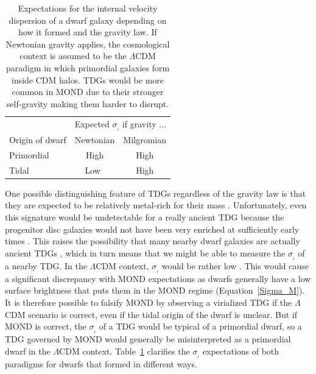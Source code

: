 \documentclass[fleqn,usenatbib,useAMS,onecolumn]{mnras} %
\begin{document}
\begin{table}
	\centering
	\begin{tabular}{lcc}
		\hline
		& \multicolumn{2}{c}{Expected $\sigma_{_i}$ if gravity $\ldots$} \\
		Origin of dwarf & Newtonian & Milgromian \\ \hline
		Primordial & High & High \\
		Tidal & Low~ & High \\ \hline
	\end{tabular}
	\caption{Expectations for the internal velocity dispersion of a dwarf galaxy depending on how it formed and the gravity law. If Newtonian gravity applies, the cosmological context is assumed to be the $\Lambda$CDM paradigm in which primordial galaxies form inside CDM halos. TDGs would be more common in MOND due to their stronger self-gravity making them harder to disrupt.}
	\label{Dwarf_type_gravity_sigma}
\end{table}

One possible distinguishing feature of TDGs regardless of the gravity law is that they are expected to be relatively metal-rich for their mass \citep{Duc_2014, Recchi_2015, Haslbauer_2019}. Unfortunately, even this signature would be undetectable for a really ancient TDG because the progenitor disc galaxies would not have been very enriched at sufficiently early times \citep{Recchi_2015}. This raises the possibility that many nearby dwarf galaxies are actually ancient TDGs \citep{Okazaki_2000}, which in turn means that we might be able to measure the $\sigma_{_i}$ of a nearby TDG. In the $\Lambda$CDM context, $\sigma_{_i}$ would be rather low \citep{Barnes_1992, Elmegreen_1993, Wetzstein_2007, Ploeckinger_2015}. This would cause a significant discrepancy with MOND expectations as dwarfs generally have a low surface brightness that puts them in the MOND regime (Equation~\ref{Sigma_M}). It is therefore possible to falsify MOND by observing a virialized TDG if the $\Lambda$CDM scenario is correct, even if the tidal origin of the dwarf is unclear. But if MOND is correct, the $\sigma_{_i}$ of a TDG would be typical of a primordial dwarf, so a TDG governed by MOND would generally be misinterpreted as a primordial dwarf in the $\Lambda$CDM context. Table~\ref{Dwarf_type_gravity_sigma} clarifies the $\sigma_{_i}$ expectations of both paradigms for dwarfs that formed in different ways.
\end{document}
